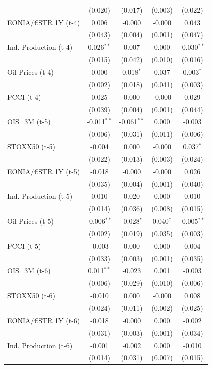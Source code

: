 \begin{longtable}[t]{lcccc}
 & (0.020) & (0.017) & (0.003) & (0.022)\\
EONIA/€STR 1Y (t-4) & 0.006 & -0.000 & -0.000 & 0.043\\
 & (0.043) & (0.004) & (0.001) & (0.047)\\
Ind. Production (t-4) & 0.026$^{**}$ & 0.007 & 0.000 & -0.030$^{**}$\\
 & (0.015) & (0.042) & (0.010) & (0.016)\\
Oil Prices (t-4) & 0.000 & 0.018$^{*}$ & 0.037 & 0.003$^{*}$\\
 & (0.002) & (0.018) & (0.041) & (0.003)\\
PCCI (t-4) & 0.025 & 0.000 & -0.000 & 0.029\\
 & (0.039) & (0.004) & (0.001) & (0.044)\\
OIS\_3M (t-5) & -0.011$^{**}$ & -0.061$^{**}$ & 0.000 & -0.003\\
 & (0.006) & (0.031) & (0.011) & (0.006)\\
STOXX50 (t-5) & -0.004 & 0.000 & -0.000 & 0.037$^{*}$\\
 & (0.022) & (0.013) & (0.003) & (0.024)\\
EONIA/€STR 1Y (t-5) & -0.018 & -0.000 & -0.000 & 0.026\\
 & (0.035) & (0.004) & (0.001) & (0.040)\\
Ind. Production (t-5) & 0.010 & 0.020 & 0.000 & 0.010\\
 & (0.014) & (0.036) & (0.008) & (0.015)\\
Oil Prices (t-5) & -0.006$^{**}$ & -0.028$^{*}$ & 0.040$^{*}$ & -0.005$^{**}$\\
 & (0.002) & (0.019) & (0.035) & (0.003)\\
PCCI (t-5) & -0.003 & 0.000 & 0.000 & 0.004\\
 & (0.033) & (0.003) & (0.001) & (0.035)\\
OIS\_3M (t-6) & 0.011$^{**}$ & -0.023 & 0.001 & -0.003\\
 & (0.006) & (0.029) & (0.010) & (0.006)\\
STOXX50 (t-6) & -0.010 & 0.000 & -0.000 & 0.008\\
 & (0.024) & (0.011) & (0.002) & (0.025)\\
EONIA/€STR 1Y (t-6) & -0.018 & -0.000 & 0.000 & -0.002\\
 & (0.031) & (0.003) & (0.001) & (0.034)\\
Ind. Production (t-6) & -0.001 & -0.002 & 0.000 & -0.010\\
 & (0.014) & (0.031) & (0.007) & (0.015)\\

\end{longtable}
